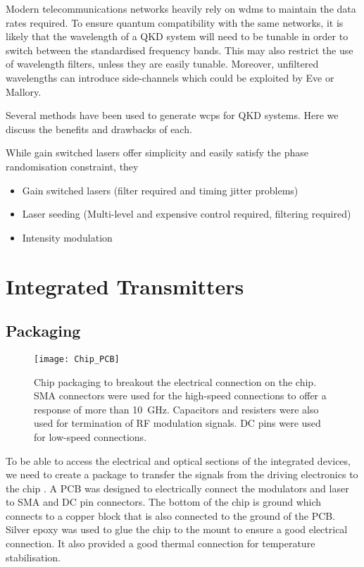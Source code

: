 Modern telecommunications networks heavily rely on \acp{wdm} to maintain the data rates required. To ensure quantum compatibility with the same networks, it is likely that the wavelength of a \ac{QKD} system will need to be tunable in order to switch between the standardised frequency bands. This may also restrict the use of wavelength filters, unless they are easily tunable. Moreover, unfiltered wavelengths can introduce side-channels which could be exploited by Eve or Mallory.

Several methods have been used to generate \acp{wcp} for \ac{QKD} systems. Here we discuss the benefits and drawbacks of each.

While gain switched lasers offer simplicity and easily satisfy the phase randomisation constraint, they  

\begin{itemize}
	\item Gain switched lasers (filter required and timing jitter problems)
	\item Laser seeding	(Multi-level and expensive control required, filtering required)
	\item Intensity modulation
\end{itemize}

\section{Integrated Transmitters}

\subsection{Packaging}

\begin{figure}[tbp]
	\centering
	\texttt{[image: Chip\_PCB]}
	\caption[Transmitter PCB package]{Chip packaging to breakout the electrical connection on the chip. SMA connectors were used for the high-speed connections to offer a response of more than \SI{10}{\GHz}. Capacitors and resisters were also used for termination of RF modulation signals. DC pins were used for low-speed connections.}
	\label{fig:chip_pcb}
\end{figure}

To be able to access the electrical and optical sections of the integrated devices, we need to create a package to transfer the signals from the driving electronics to the chip . A PCB was designed to electrically connect the modulators and laser to SMA and DC pin connectors. The bottom of the chip is ground which connects to a copper block that is also connected to the ground of the PCB. Silver epoxy was used to glue the chip to the mount to ensure a good electrical connection. It also provided a good thermal connection for temperature stabilisation.

